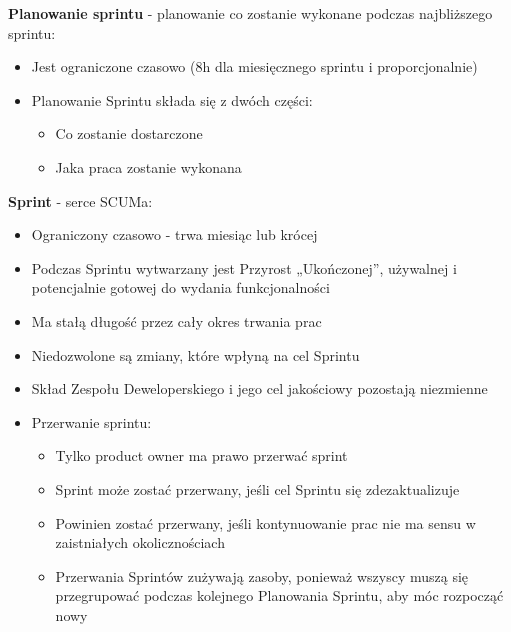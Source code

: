 \documentclass[12pt]{article}
\begin{document}
    \begin{definition}
    \textbf{Planowanie sprintu} - planowanie co zostanie wykonane podczas najbliższego sprintu:
    \begin{itemize}
        \item Jest ograniczone czasowo (8h dla miesięcznego sprintu i proporcjonalnie)
        \item Planowanie Sprintu składa się z dwóch części:
            \begin{itemize}
                \item Co zostanie dostarczone
                \item Jaka praca zostanie wykonana
            \end{itemize}
    \end{itemize}
    \end{definition}
    
    \begin{definition}
    \textbf{Sprint} - serce SCUMa:
    \begin{itemize}
        \item Ograniczony czasowo - trwa miesiąc lub krócej
        \item Podczas Sprintu wytwarzany jest Przyrost „Ukończonej”, używalnej i potencjalnie gotowej do wydania funkcjonalności
        \item Ma stałą długość przez cały okres trwania prac
        \item Niedozwolone są zmiany, które wpłyną na cel Sprintu
        \item Skład Zespołu Deweloperskiego i jego cel jakościowy pozostają niezmienne
        \item Przerwanie sprintu:
            \begin{itemize}
                \item Tylko product owner ma prawo przerwać sprint
                \item Sprint może zostać przerwany, jeśli cel Sprintu się zdezaktualizuje
                \item Powinien zostać przerwany, jeśli kontynuowanie prac nie ma sensu w zaistniałych okolicznościach
                \item Przerwania Sprintów zużywają zasoby, ponieważ wszyscy muszą się przegrupować podczas kolejnego Planowania Sprintu, aby móc rozpocząć nowy
            \end{itemize}
    \end{itemize}
    \end{definition}
    
\end{document}
